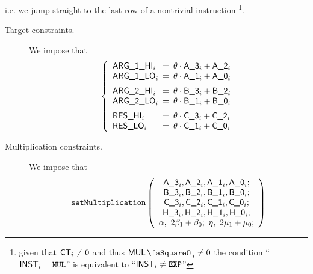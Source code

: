 \begin{center}
\end{center}
i.e. we jump straight to the last row of a nontrivial  instruction%
\footnote{given that $\textsf{CT}_{i} \neq 0$ and thus $\mulStamp_{i}\neq0$ the condition ``$\textsf{INST}_{i} = \texttt{MUL}$'' is equivalent to ``$\textsf{INST}_{i} \neq \texttt{EXP}$''}.
\begin{description}
	\item[Target constraints.] We impose that
		\[
			\left\{ \begin{array}{lcl}
				\argOneHi _{i} & \!\!\! = \!\!\! & \theta \cdot \col{A\_3}_{i} + \col{A\_2}_{i}              \\
				\argOneLo _{i} & \!\!\! = \!\!\! & \theta \cdot \col{A\_1}_{i} + \col{A\_0}_{i} \vspace{2mm} \\
				\argTwoHi _{i} & \!\!\! = \!\!\! & \theta \cdot \col{B\_3}_{i} + \col{B\_2}_{i}              \\
				\argTwoLo _{i} & \!\!\! = \!\!\! & \theta \cdot \col{B\_1}_{i} + \col{B\_0}_{i} \vspace{2mm} \\
				\resHi    _{i} & \!\!\! = \!\!\! & \theta \cdot \col{C\_3}_{i} + \col{C\_2}_{i}              \\
				\resLo    _{i} & \!\!\! = \!\!\! & \theta \cdot \col{C\_1}_{i} + \col{C\_0}_{i}              \\
			\end{array} \right.
		\]
	\item[Multiplication constraints.] We impose that
		\[
			\texttt{setMultiplication}
			\left( \begin{array}{c}
				\textsf{A\_3}_{i}, \textsf{A\_2}_{i}, \textsf{A\_1}_{i}, \textsf{A\_0}_{i}; \\
				\textsf{B\_3}_{i}, \textsf{B\_2}_{i}, \textsf{B\_1}_{i}, \textsf{B\_0}_{i}; \\
				\textsf{C\_3}_{i}, \textsf{C\_2}_{i}, \textsf{C\_1}_{i}, \textsf{C\_0}_{i}; \\
				\textsf{H\_3}_{i}, \textsf{H\_2}_{i}, \textsf{H\_1}_{i}, \textsf{H\_0}_{i}; \\
				\alpha, ~ 2\beta_{1} + \beta_{0}; ~ \eta, ~ 2\mu_{1} + \mu_{0}; \\
			\end{array} \right)
		\]
\end{description}

